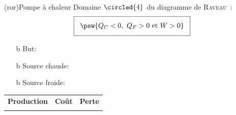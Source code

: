 \documentclass[../../main/main.tex]{subfiles}
\begin{document}
\begin{tcb*}[sidebyside](ror){Pompe à chaleur}
	Domaine $\circled{4}$ du diagramme de \textsc{Raveau}~:
	\begin{gather*}
		\setlength{\fboxsep}{3mm}
		\boxed{\psw{Q_C < 0,~Q_F > 0 \text{~et~} W > 0}}
	\end{gather*}
	\begin{itemize}
		\item[b]{But}: 
		\item[b]{\color{red}Source chaude}: 
		\item[b]{\color{blue}Source froide}: 
	\end{itemize}
	\begin{tabularx}{\linewidth}{YYY}
		\textbf{Production} &
		\textbf{Coût}       &
		\textbf{Perte}
		\\
		        &
		           &
	\end{tabularx}
	\tcblower
	\begin{center}
		\vspace{-15pt}
	\end{center}
\end{tcb*}
\end{document}
